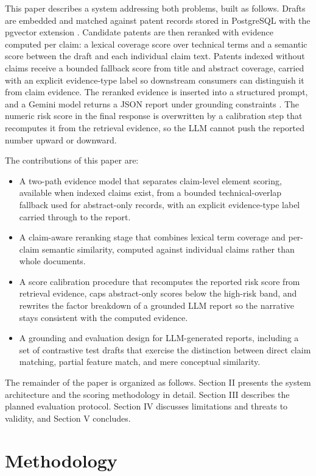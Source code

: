 \documentclass[journal]{IEEEtran}
\begin{document}
This paper describes a system addressing both problems, built as follows. Drafts are embedded and matched against patent records stored in PostgreSQL with the pgvector extension \cite{pgvector}. Candidate patents are then reranked with evidence computed per claim: a lexical coverage score over technical terms and a semantic score between the draft and each individual claim text. Patents indexed without claims receive a bounded fallback score from title and abstract coverage, carried with an explicit evidence-type label so downstream consumers can distinguish it from claim evidence. The reranked evidence is inserted into a structured prompt, and a Gemini model returns a JSON report under grounding constraints \cite{google2025gemini}. The numeric risk score in the final response is overwritten by a calibration step that recomputes it from the retrieval evidence, so the LLM cannot push the reported number upward or downward.

The contributions of this paper are:
\begin{itemize}
\item A two-path evidence model that separates claim-level element scoring, available when indexed claims exist, from a bounded technical-overlap fallback used for abstract-only records, with an explicit evidence-type label carried through to the report.
\item A claim-aware reranking stage that combines lexical term coverage and per-claim semantic similarity, computed against individual claims rather than whole documents.
\item A score calibration procedure that recomputes the reported risk score from retrieval evidence, caps abstract-only scores below the high-risk band, and rewrites the factor breakdown of a grounded LLM report so the narrative stays consistent with the computed evidence.
\item A grounding and evaluation design for LLM-generated reports, including a set of contrastive test drafts that exercise the distinction between direct claim matching, partial feature match, and mere conceptual similarity.
\end{itemize}

The remainder of the paper is organized as follows. Section II presents the system architecture and the scoring methodology in detail. Section III describes the planned evaluation protocol. Section IV discusses limitations and threats to validity, and Section V concludes.

\section{Methodology}
\end{document}
